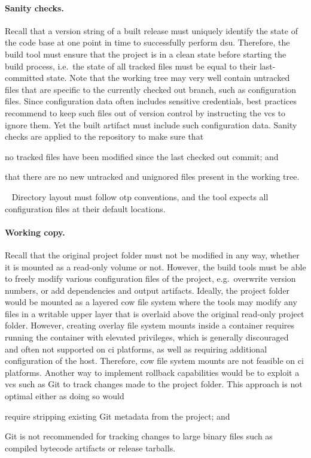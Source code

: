 \paragraph{Sanity checks.} Recall that a version string of a built release must uniquely identify the state of the code base at one point in time to successfully perform \acrshort{dsu}. Therefore, the build tool must ensure that the project is in a clean state before starting the build process, i.e.~the state of all tracked files must be equal to their last-committed state. Note that the working tree may very well contain untracked files that are specific to the currently checked out branch, such as configuration files. Since configuration data often includes sensitive credentials, best practices recommend to keep such files out of version control by instructing the \acrshort{vcs} to ignore them. Yet the built artifact must include such configuration data. Sanity checks are applied to the repository to make sure that \begin{enumerate*}[label=(\roman*)]
  \item no tracked files have been modified since the last checked out commit; and
  \item that there are no new untracked and unignored files present in the working tree.
\end{enumerate*}~\cite{man:git}
Directory layout must follow \acrshort{otp} conventions, and the tool expects all configuration files at their default locations.

\paragraph{Working copy.} Recall that the original project folder must not be modified in any way, whether it is mounted as a read-only volume or not. However, the build tools must be able to freely modify various configuration files of the project, e.g.~overwrite version numbers, or add dependencies and output artifacts.
Ideally, the project folder would be mounted as a layered \acrfull{cow} file system where the tools may modify any files in a writable upper layer that is overlaid above the original read-only project folder. However, creating overlay file system mounts inside a container requires running the container with elevated privileges, which is generally discouraged~\cite{docker:docs} and often not supported on \acrshort{ci} platforms, as well as requiring additional configuration of the host. Therefore, \acrshort{cow} file system mounts are not feasible on \acrshort{ci} platforms. Another way to implement rollback capabilities would be to exploit a \acrlong{vcs} such as Git to track changes made to the project folder. This approach is not optimal either as doing so would \begin{enumerate*}[label=(\roman*)]
  \item require stripping existing Git metadata from the project; and
  \item Git is not recommended for tracking changes to large binary files such as compiled bytecode artifacts or release tarballs.
\end{enumerate*}

